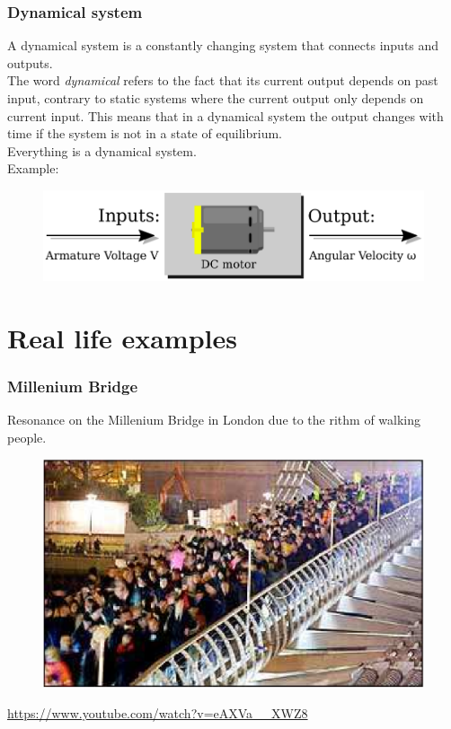 \begin{frame}
	\frametitle{Dynamical system}
	A dynamical system is a constantly changing system that connects inputs and outputs.\\The word \textit{dynamical} refers to the fact that its current output depends on past input, contrary to static systems where the current output only depends on current input. This means that in a dynamical system the output changes with time if the system is not in a state of equilibrium.\\
	\medskip
	Everything is a dynamical system.\\
	Example:\\
	\begin{figure}
		\includegraphics[width=0.7\linewidth]{dc_motor}
	\end{figure}
\end{frame}

\section{Real life examples} 

\begin{frame}
	\frametitle{Millenium Bridge}
	Resonance on the Millenium Bridge in London due to the rithm of walking people.
	\begin{figure}
		\includegraphics[scale=0.3]{millenium_bridge}
	\end{figure}
	\url{https://www.youtube.com/watch?v=eAXVa__XWZ8}
\end{frame}

